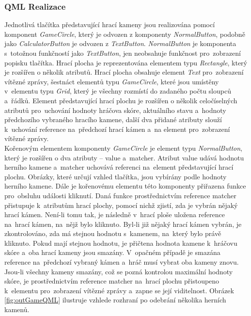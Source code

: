\documentclass[11pt,twoside,a4paper]{book}
\begin{document}
\subsubsection{QML Realizace}
Jednotlivá tlačítka představující hrací kameny jsou realizována pomocí komponent \textit{GameCircle}, který je odvozen z komponenty \textit{NormalButton}, podobně jako \textit{CalculatorButton} je odvozen z \textit{TextButton}. \textit{NormalButton} je komponenta s~totožnou funkčností jako \textit{TextButton}, jen neobsahuje funkčnost pro~zobrazení popisku tlačítka.
Hrací plocha je reprezentována elementem typu \textit{Rectangle}, který je rozšířen o několik atributů. Hrací plocha obsahuje element \textit{Text} pro~zobrazení vítězné zprávy, šestnáct elementů typu \textit{GameCircle}, které jsou umístěny v~elementu typu \textit{Grid}, který je všechny rozmístí do zadaného počtu sloupců a~řádků. Element představující hrací plochu je rozšířen o několik celočíselných atributů pro~uchování hodnoty hráčova skóre, aktuálního stavu a~hodnoty předchozího vybraného hracího kamene, další dva přidané atributy slouží k~uchování reference na~předchozí hrací kámen a~na element pro~zobrazení vítězné zprávy.\\
Kořenovým elementem komponenty \textit{GameCircle} je element typu \textit{NormalButton}, který je rozšířen o dva atributy – value a~matcher. Atribut value udává hodnotu herního kamene a~matcher uchovává referenci na~element představující hrací plochu. Obrázky, které určují vzhled tlačítka, jsou vybírány podle hodnoty herního kamene. Dále je kořenovému elementu této komponenty přiřazena funkce pro~obsluhu události kliknutí. Daná funkce prostřednictvím reference matcher přistupuje k~atributům hrací plochy, pomocí nichž zjistí, zda je vybrán nějaký hrací kámen. Není-li tomu tak, je následně v~hrací ploše uložena reference na~hrací kámen, na~nějž bylo kliknuto. Byl-li již nějaký hrací kámen vybrán, je zkontrolováno, zda má stejnou hodnotu s~kamenem, na~který bylo právě kliknuto. Pokud mají stejnou hodnotu, je přičtena hodnota kamene k~hráčovu skóre a~oba hrací kameny jsou smazány. V~opačném případě je smazána reference na~předchozí vybraný kámen a~hráč musí vybrat oba kameny znovu. Jsou-li všechny kameny smazány, což se pozná kontrolou maximální hodnoty skóre, je prostřednictvím reference matcher na~hrací plochu přistoupeno k~elementu pro~zobrazení vítězné zprávy a~zapne se její viditelnost. Obrázek \ref{fig:outGameQML} ilustruje vzhlede rozhraní po odebrání několika herních kamenů.
\end{document}
